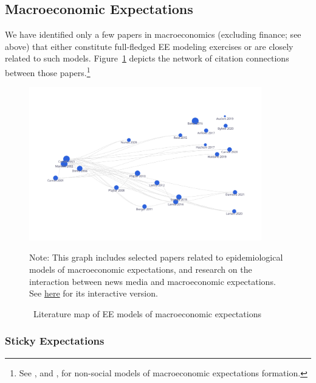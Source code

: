 \subsection{Macroeconomic Expectations}\label{subsec:macroExp}

We have identified only a few papers in macroeconomics (excluding finance; see above) that either constitute full-fledged EE modeling exercises or are closely related to such models. Figure~\ref{fig:graph_macro} depicts the network of citation connections between those papers.\footnote{See \dmwinflationexpectationFull, and \bvbayesianlearningFull, for non-social models of macroeconomic expectations formation.}



\begin{figure}[!ht] \centering  %
	\caption{ ~Literature map of EE models of macroeconomic expectations}
	\label{fig:graph_macro}
	\centerline{\includegraphics[width=0.9\textwidth]{./figures/graph_macro}}
	\begin{flushleft}
		{\footnotesize Note: This graph includes selected papers related to epidemiological models of macroeconomic expectations, and research on the interaction between news media and macroeconomic expectations. See \href{https://app.litmaps.co/shared/289F57F4-FDE5-4F94-B1A9-2BA7419DB719}{here} for its interactive version.}
	\end{flushleft}
\end{figure}


\subsubsection{Sticky Expectations}

